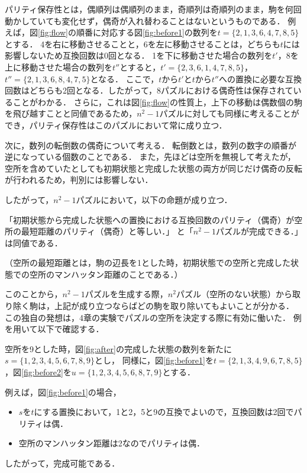 パリティ保存性とは，偶順列は偶順列のまま，奇順列は奇順列のまま，駒を何回動かしていても変化せず，偶奇が入れ替わることはないというものである．
例えば，図\ref{fig:flow}の順番に対応する図\ref{fig:before1}の数列を\(t=\{2,1,3,6,4,7,8,5\}\)とする．
4を右に移動させることと，6を左に移動させることは，どちらも\(t\)には影響しないため互換回数は0回となる．
1を下に移動させた場合の数列を\(t'\)，8を上に移動させた場合の数列を\(t''\)とすると，\(t'=\{2,3,6,1,4,7,8,5\}\)，\(t''=\{2,1,3,6,8,4,7,5\}\)となる．
ここで，\(t\)から\(t'\)と\(t\)から\(t''\)への置換に必要な互換回数はどちらも2回となる．したがって，8パズルにおける偶奇性は保存されていることがわかる．
さらに，これは図\ref{fig:flow}の性質上，上下の移動は偶数個の駒を飛び越すことと同値であるため，\(n^2-1\)パズルに対しても同様に考えることができ，パリティ保存性はこのパズルにおいて常に成り立つ．

次に，数列の転倒数の偶奇について考える．
転倒数とは，数列の数字の順番が逆になっている個数のことである．
また，先ほどは空所を無視して考えたが，空所を含めていたとしても初期状態と完成した状態の両方が同じだけ偶奇の反転が行われるため，判別には影響しない．

したがって，\(n^2-1\)パズルにおいて，以下の命題が成り立つ．
	\begin{screen}
		「初期状態から完成した状態への置換における互換回数のパリティ（偶奇）が空所の最短距離のパリティ（偶奇）と等しい．」
		と「\(n^2-1\)パズルが完成できる．」は同値である．

		（空所の最短距離とは，駒の辺長を1とした時，初期状態での空所と完成した状態での空所のマンハッタン距離のことである．）
		\label{fig:thm1}
	\end{screen}

このことから，\(n^2-1\)パズルを生成する際，\(n^2\)パズル（空所のない状態）から取り除く駒は，上記が成り立つならばどの駒を取り除いてもよいことが分かる．
この独自の発想は，4章の実験でパズルの空所を決定する際に有効に働いた．
例を用いて以下で確認する．

空所を9とした時，図\ref{fig:after}の完成した状態の数列を新たに\(s=\{1,2,3,4,5,6,7,8,9\}\)とし，
同様に，図\ref{fig:before1}を\(t=\{2,1,3,4,9,6,7,8,5\}\)，図\ref{fig:before2}を\(u=\{1,2,3,4,5,6,8,7,9\}\)とする．

例えば，図\ref{fig:before1}の場合，

\begin{itemize}
 \item \(s\)を\(t\)にする置換において，1と2，5と9の互換でよいので，互換回数は2回でパリティは偶．
 \item 空所のマンハッタン距離は2なのでパリティは偶．
\end{itemize}
したがって，完成可能である．

